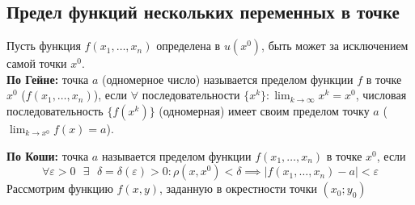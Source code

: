 \documentclass[12pt]{article}
\let\ORIincludegraphics\includegraphics
\renewcommand{\includegraphics}[2][]{\ORIincludegraphics[scale=0.65,#1]{#2}}
\begin{document}
    \subsection{Предел функций нескольких переменных в точке}
    \noindent Пусть функция $f(x_1, \dots, x_n)$ определена в $u(x^0)$, быть может за исключением самой точки $x^0$.\\
    \textbf{По Гейне:} точка $a$ (одномерное число) называется пределом функции $f$ в точке $x^0$ ($f(x_1, \dots, x_n)$), если $\forall$ последовательности $\{x^k\} : \lim_{k\to\infty}x^k=x^0$, числовая последовательность $\{ f(x^k) \}$ (одномерная) имеет своим пределом точку $a$ ($\lim_{k\to x^0}f(x)=a$).\par\noindent
    \textbf{По Коши:} точка $a$ называется пределом функции $f(x_1, \dots, x_n)$ в точке $x^0$, если
    \[ \forall \varepsilon > 0 \text{ } \exists \text{ } \delta = \delta(\varepsilon) > 0 : \rho(x, x^0) < \delta \implies |f(x_1, \dots, x_n) - a| < \varepsilon \]
    Рассмотрим функцию $f(x,y)$, заданную в окрестности точки $(x_0; y_0)$
\end{document}
